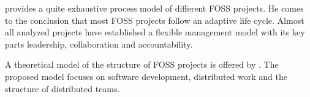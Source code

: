 \textcite{Johnson2001} provides a quite exhaustive process model of different
\ac{FOSS} projects. He comes to the conclusion that most \ac{FOSS} projects
follow an adaptive life cycle. Almost all analyzed projects have established a
flexible management model with its key parts leadership, collaboration and
accountability.

A theoretical model of the structure of \ac{FOSS} projects is offered by
\textcite{Crowston2005}. The proposed model focuses on software development,
distributed work and the structure of distributed teams.


